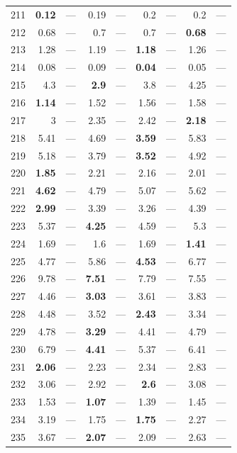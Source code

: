 \begin{longtable}{lr@{\hskip 4pt}l@{\hskip 12pt}r@{\hskip 4pt}l@{\hskip 12pt}r@{\hskip 4pt}l@{\hskip 12pt}r@{\hskip 4pt}l@{\hskip 12pt}}
211 & \textbf{0.12} & --- & 0.19 & --- & 0.2 & --- & 0.2 & --- \\
212 & 0.68 & --- & 0.7 & --- & 0.7 & --- & \textbf{0.68} & --- \\
213 & 1.28 & --- & 1.19 & --- & \textbf{1.18} & --- & 1.26 & --- \\
214 & 0.08 & --- & 0.09 & --- & \textbf{0.04} & --- & 0.05 & --- \\
215 & 4.3 & --- & \textbf{2.9} & --- & 3.8 & --- & 4.25 & --- \\
216 & \textbf{1.14} & --- & 1.52 & --- & 1.56 & --- & 1.58 & --- \\
217 & 3 & --- & 2.35 & --- & 2.42 & --- & \textbf{2.18} & --- \\
218 & 5.41 & --- & 4.69 & --- & \textbf{3.59} & --- & 5.83 & --- \\
219 & 5.18 & --- & 3.79 & --- & \textbf{3.52} & --- & 4.92 & --- \\
220 & \textbf{1.85} & --- & 2.21 & --- & 2.16 & --- & 2.01 & --- \\
221 & \textbf{4.62} & --- & 4.79 & --- & 5.07 & --- & 5.62 & --- \\
222 & \textbf{2.99} & --- & 3.39 & --- & 3.26 & --- & 4.39 & --- \\
223 & 5.37 & --- & \textbf{4.25} & --- & 4.59 & --- & 5.3 & --- \\
224 & 1.69 & --- & 1.6 & --- & 1.69 & --- & \textbf{1.41} & --- \\
225 & 4.77 & --- & 5.86 & --- & \textbf{4.53} & --- & 6.77 & --- \\
226 & 9.78 & --- & \textbf{7.51} & --- & 7.79 & --- & 7.55 & --- \\
227 & 4.46 & --- & \textbf{3.03} & --- & 3.61 & --- & 3.83 & --- \\
228 & 4.48 & --- & 3.52 & --- & \textbf{2.43} & --- & 3.34 & --- \\
229 & 4.78 & --- & \textbf{3.29} & --- & 4.41 & --- & 4.79 & --- \\
230 & 6.79 & --- & \textbf{4.41} & --- & 5.37 & --- & 6.41 & --- \\
231 & \textbf{2.06} & --- & 2.23 & --- & 2.34 & --- & 2.83 & --- \\
232 & 3.06 & --- & 2.92 & --- & \textbf{2.6} & --- & 3.08 & --- \\
233 & 1.53 & --- & \textbf{1.07} & --- & 1.39 & --- & 1.45 & --- \\
234 & 3.19 & --- & 1.75 & --- & \textbf{1.75} & --- & 2.27 & --- \\
235 & 3.67 & --- & \textbf{2.07} & --- & 2.09 & --- & 2.63 & --- \\

\end{longtable}
